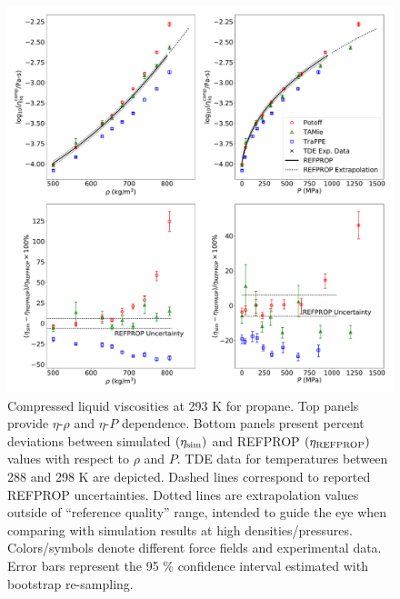 \documentclass[preprint,review,12pt]{elsarticle}
\begin{document}
	\begin{figure}[H]
		\centering
		\includegraphics[width=6.4in]{compare_REFPROP_T293highP_C3H8.pdf}
		\caption{Compressed liquid viscosities at 293 K for propane. Top panels provide $\eta$-$\rho$ and $\eta$-$P$ dependence. Bottom panels present percent deviations between simulated $(\eta_{\rm sim})$ and REFPROP $(\eta_{\rm REFPROP})$ values with respect to $\rho$ and $P$. TDE data for temperatures between 288 and 298 K are depicted. Dashed lines correspond to reported REFPROP uncertainties. Dotted lines are extrapolation values outside of ``reference quality'' range, intended to guide the eye when comparing with simulation results at high densities/pressures. Colors/symbols denote different force fields and experimental data. Error bars represent the 95 \% confidence interval estimated with bootstrap re-sampling.}
		\label{fig:T293highP_C3}
	\end{figure} 

	
\end{document}
